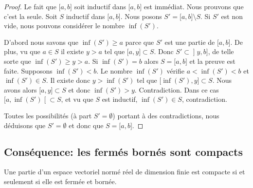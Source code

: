 \begin{proof}
	Le fait que \( \mathopen[ a , b \mathclose]\) soit inductif dans \( \mathopen[ a , b \mathclose]\) est immédiat. Nous prouvons que c'est la seule. Soit \( S\) inductif dans \( \mathopen[ a , b \mathclose]\). Nous posons \( S'=\mathopen[ a , b \mathclose]\setminus S\). Si \( S'\) est non vide, nous pouvons considérer le nombre \( \inf(S')\).

	\begin{subproof}
		D'abord nous savons que \( \inf(S')\geq a\) parce que \( S'\) est une partie de \( \mathopen[ a , b \mathclose]\). De plus, vu que \( a\in S\) il existe \( y>a\) tel que \( \mathopen[ a , y \mathclose]\subset S\). Donc \( S'\subset\mathopen] y , b \mathclose]\), de telle sorte que \( \inf(S')\geq y>a\).
		\spitem[Si \( \inf(S')\in S\)]
		Si \( \inf(S')=b\) alors \( S=\mathopen[ a , b \mathclose]\) et la preuve est faite. Supposons \( \inf(S')<b\). Le nombre \( \inf(S')\) vérifie \( a<\inf(S')<b\) et \( \inf(S')\in S\). Il existe donc \( y>\inf(S')\) tel que \( \mathopen[ \inf(S') , y \mathclose]\subset S\). Nous avons alors \( \mathopen[ a , y \mathclose]\subset S\) et donc \( \inf(S')>y\). Contradiction.
		\spitem[Si \( \inf(S')\in S'\)]
		Dans ce cas \( \mathopen[ a , \inf(S') \mathclose[\subset S\), et vu que \(S \) est inductif, \( \inf(S')\in S\), contradiction.
	\end{subproof}
	Toutes les possibilités (à part \( S'=\emptyset\)) portant à des contradictions, nous déduisons que \( S'=\emptyset\) et donc que \( S=\mathopen[ a , b \mathclose]\).
\end{proof}

\subsection{Conséquence: les fermés bornés sont compacts}

\begin{theorem} \label{ThoXTEooxFmdI}
	Une partie d'un espace vectoriel normé réel de dimension finie est compacte si et seulement si elle est fermée et bornée.
\end{theorem}

